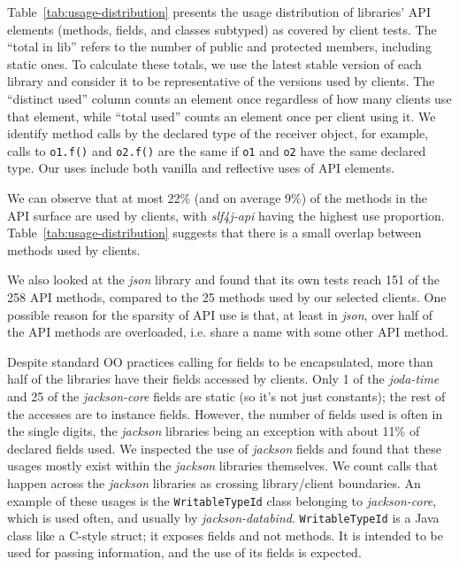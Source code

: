 Table~\ref{tab:usage-distribution} presents the usage distribution of
libraries' API elements (methods, fields, and classes subtyped) as
covered by client tests. The ``total in lib'' refers to the number of
public and protected members, including static ones. To calculate these totals,
we use the latest stable version of each library and consider it to be representative of 
the versions used by clients.  The ``distinct used'' column counts an
element once regardless of how many clients use that element, while
``total used'' counts an element once per client using it. We identify method calls by the
declared type of the receiver object, for example, calls to {\tt o1.f()} and {\tt o2.f()} are the same
if {\tt o1} and {\tt o2} have the same declared type.
Our uses 
include both vanilla and reflective uses of API elements.



We can observe that at most 22\% (and on average 9\%) of the methods in the API surface
are used by clients, with \emph{slf4j-api} having the highest use proportion.
Table~\ref{tab:usage-distribution} suggests that there is a small overlap between methods
used by clients.

We also looked at the \emph{json} library and found that its own tests reach 151
of the 258 API methods, compared to the 25 methods used by our selected
clients. One possible reason for the sparsity of API use is that, at least in \emph{json}, over half of the API methods are overloaded, i.e. share a name with
some other API method.

Despite standard OO practices calling for fields to be encapsulated, more than half of the libraries have their fields accessed by clients. Only 1 of the \emph{joda-time} and 25 of the \emph{jackson-core} fields are static (so it's not just constants); the rest of the accesses are to instance fields.
However, the number of fields used is often in the single digits,
the \emph{jackson} libraries being an exception with about 11\% of declared fields used.
We inspected the use of \emph{jackson} fields and found that these usages mostly exist within the \emph{jackson} libraries themselves.
We count calls that happen across the \emph{jackson} libraries as crossing library/client boundaries.
An example of these usages is the {\tt WritableTypeId} class belonging to \emph{jackson-core}, which is used often, and usually by \emph{jackson-databind}.
{\tt WritableTypeId} is a Java class like a C-style struct; it exposes fields and not methods. It is intended to be used for passing information, and the use of its fields is expected.

